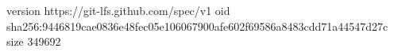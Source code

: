 version https://git-lfs.github.com/spec/v1
oid sha256:9446819cae0836e48fec05e106067900afe602f69586a8483cdd71a44547d27c
size 349692
